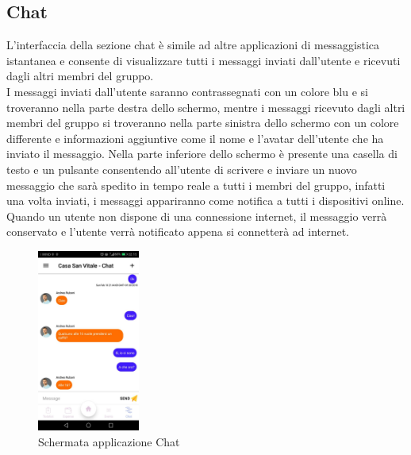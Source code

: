 \subsection{Chat}
L'interfaccia della sezione chat è simile ad altre applicazioni di messaggistica istantanea e consente di visualizzare tutti i messaggi inviati dall'utente e ricevuti dagli altri membri del gruppo.\\
I messaggi inviati dall'utente saranno contrassegnati con un colore blu e si troveranno nella parte destra dello schermo, mentre i messaggi ricevuto dagli altri membri del gruppo si troveranno nella parte sinistra dello schermo con un colore differente e informazioni aggiuntive come il nome e l'avatar dell'utente che ha inviato il messaggio.
Nella parte inferiore dello schermo è presente una casella di testo e un pulsante consentendo all'utente di scrivere e inviare un nuovo messaggio che sarà spedito in tempo reale a tutti i membri del gruppo, infatti una volta inviati, i messaggi appariranno come notifica a tutti i dispositivi online.\\
Quando un utente non dispone di una connessione internet, il messaggio verrà conservato e l'utente verrà notificato appena si connetterà ad internet.

\begin{figure}[!h]
  \centering
  \includegraphics[width=0.3\textwidth]{immagini/app_chat.jpg}
  \caption{Schermata applicazione Chat}\label{fig:Schermata applicazione Chat}
\end{figure}

